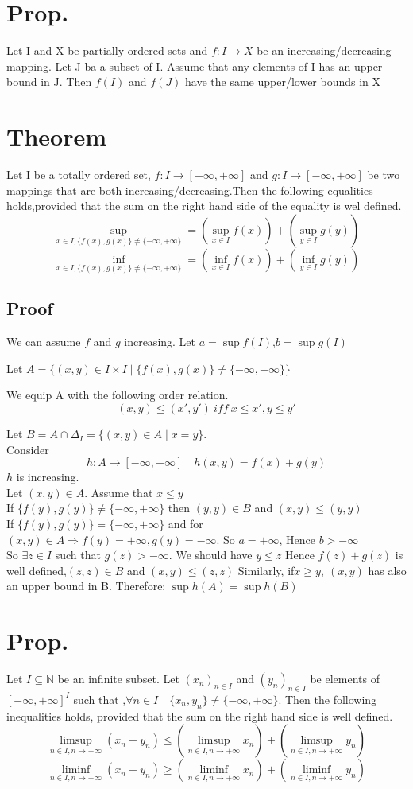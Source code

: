 \documentclass{book}
\begin{document}
\section{Prop.}
Let I and X be partially ordered sets and $f:I\rightarrow X$ be an increasing/decreasing mapping. Let J ba a subset of I. Assume that any elements of I has an upper bound in J. Then $f(I)$ and $f(J)$ have the same upper/lower bounds in X
\section{Theorem}
Let I be a totally ordered set, $f:I\rightarrow[-\infty,+\infty]$ and $g:I\rightarrow[-\infty,+\infty]$ be two mappings that are both increasing/decreasing.Then the following equalities holds,provided that the sum on the right hand side of the equality is wel defined.
$$\sup\limits_{x\in I,\{f(x),g(x)\}\not =\{-\infty,+\infty\}}=(\sup\limits_{x\in I}f(x))+(\sup\limits_{y\in I}g(y))$$
$$\inf\limits_{x\in I,\{f(x),g(x)\}\not =\{-\infty,+\infty\}}=(\inf\limits_{x\in I}f(x))+(\inf\limits_{y\in I}g(y))$$
\subsection*{Proof}
We can assume $f$ and $g$ increasing. Let $a=\sup f(I)$,$b=\sup g(I)$

Let $A=\{(x,y)\in I\times I\mid\{f(x),g(x)\}\not=\{-\infty,+\infty\}\}$

We equip A with the following order relation.
$$(x,y)\leq(x',y')\ iff\ x\leq x',y\leq y'$$

Let $B=A\cap\Delta_I=\{(x,y)\in A\mid x=y\}$.\\ Consider $$h: A\rightarrow[-\infty,+\infty]\quad h(x,y)=f(x)+g(y)$$
$h$ is increasing.\\
Let $(x,y)\in A$. Assume that $x\leq y$\\
If $\{f(y),g(y)\}\not=\{-\infty,+\infty\}$ then $(y,y)\in B$ and $(x,y)\leq(y,y)$\\
If $\{f(y),g(y)\}=\{-\infty,+\infty\}$ and for $(x,y)\in A\Rightarrow f(y)=+\infty,g(y)=-\infty$. So $a=+\infty$, Hence $b>-\infty$\\
So $\exists z\in I$ such that $g(z)>-\infty$. We should have $y\leq z$ Hence $f(z)+g(z)$ is well defined,$(z,z)\in B$ and $(x,y)\leq(z,z)$ Similarly, if$x\geq y,\ (x,y)$ has also an upper bound in B. Therefore: $\sup h(A)=\sup h(B)$
\section{Prop.}
Let $I\subseteq\mathbb{N} $ be an infinite subset. Let $(x_n)_{n\in I}$ and $(y_n)_{n\in I}$ be elements of $[-\infty,+\infty]^I$ such that ,$\forall n\in I\quad \{x_n,y_n\}\not=\{-\infty,+\infty\}$. Then the following inequalities holds, provided that the sum on the right hand side is well defined.
$$\limsup\limits_{n\in I,n\rightarrow+\infty}(x_n+y_n)\leq(\limsup\limits_{n\in I,n\rightarrow+\infty}x_n)+(\limsup\limits_{n\in I,n\rightarrow+\infty}y_n)$$
$$\liminf\limits_{n\in I,n\rightarrow+\infty}(x_n+y_n)\geq(\liminf\limits_{n\in I,n\rightarrow+\infty}x_n)+(\liminf\limits_{n\in I,n\rightarrow+\infty}y_n)$$
\end{document}
